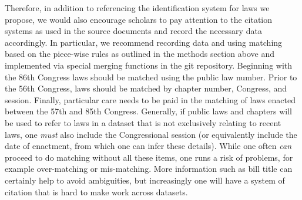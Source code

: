 \documentclass[fleqn,10pt]{wlscirep}
\begin{document}
Therefore, in addition to referencing the identification system for laws we propose, we would also encourage scholars to pay attention to the citation systems as used in the source documents and record the necessary data accordingly. In particular, we recommend recording data and using matching based on the piece-wise rules as outlined in the methods section above and implemented via special merging functions in the git repository. Beginning with the 86th Congress laws should be matched using the public law number. Prior to the 56th Congress, laws should be matched by chapter number, Congress, and session. Finally, particular care needs to be paid in the matching of laws enacted between the 57th and 85th Congress. Generally, if public laws and chapters will be used to refer to laws in a dataset that is not exclusively relating to recent laws, one \textit{must} also include the Congressional session (or equivalently include the date of enactment, from which one can infer these details). While one often \textit{can} proceed to do matching without all these items, one runs a risk of problems, for example over-matching or mis-matching. More information such as bill title can certainly help to avoid ambiguities, but increasingly one will have a system of citation that is hard to make work across datasets.
\end{document}
